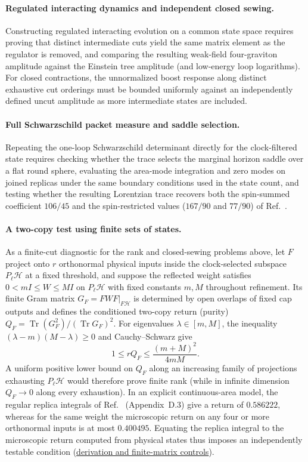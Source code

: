 \documentclass[10pt,a4paper]{article}
\numberwithin{equation}{section}
\newcommand{\repo}[2]{\href{https://github.com/sprajs/quantum-gravity/blob/main/#1}{#2}}
\newcommand{\tr}{\operatorname{Tr}}
\newcommand{\HH}{\mathcal{H}}
\begin{document}
\paragraph{Regulated interacting dynamics and independent closed sewing.}
Constructing regulated interacting evolution on a common state space requires proving that distinct intermediate cuts yield the same matrix element as the regulator is removed, and comparing the resulting weak-field four-graviton amplitude against the Einstein tree amplitude (and low-energy loop logarithms).
For closed contractions, the unnormalized boost response along distinct exhaustive cut orderings must be bounded uniformly against an independently defined uncut amplitude as more intermediate states are included.

\paragraph{Full Schwarzschild packet measure and saddle selection.}
Repeating the one-loop Schwarzschild determinant directly for the clock-filtered state requires checking whether the trace selects the marginal horizon saddle over a flat round sphere, evaluating the area-mode integration and zero modes on joined replicas under the same boundary conditions used in the state count, and testing whether the resulting Lorentzian trace recovers both the spin-summed coefficient $106/45$ and the spin-restricted values ($167/90$ and $77/90$) of Ref.~\cite{Sen2013}.

\paragraph{A two-copy test using finite sets of states.}
As a finite-cut diagnostic for the rank and closed-sewing problems above, let $F$ project onto $r$ orthonormal physical inputs inside the clock-selected subspace $P_\ell\HH$ at a fixed threshold, and suppose the reflected weight satisfies $0<mI\le W\le MI$ on $P_\ell\HH$ with fixed constants $m,M$ throughout refinement. Its finite Gram matrix $G_F=FWF|_{F\HH}$ is determined by open overlaps of fixed cap outputs and defines the conditioned two-copy return (purity) $Q_F=\tr(G_F^2)/(\tr G_F)^2$. For eigenvalues $\lambda\in[m,M]$, the inequality $(\lambda-m)(M-\lambda)\ge0$ and Cauchy--Schwarz give
\begin{equation}
  1\le rQ_F\le \frac{(m+M)^2}{4mM}.
  \label{eq:two-copy-bound}
\end{equation}
A uniform positive lower bound on $Q_F$ along an increasing family of projections exhausting $P_\ell\HH$ would therefore prove finite rank (while in infinite dimension $Q_F\to 0$ along every exhaustion). In an explicit continuous-area model, the regular replica integrals of Ref.~\cite{Chandrasekaran2026} (Appendix~D.3) give a return of $0.586222$, whereas for the same weight the microscopic return on any four or more orthonormal inputs is at most $0.400495$. Equating the replica integral to the microscopic return computed from physical states thus imposes an independently testable condition (\repo{audit/purity-test.md}{derivation and finite-matrix controls}).
\end{document}
